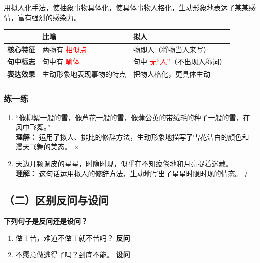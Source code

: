 \begin{definition}[拟人] \label{def:int} 
用拟人化手法，使抽象事物具体化，使具体事物人格化，生动形象地表达了某某感情，富有强烈的感染力。
\end{definition}

\begin{center}
    \renewcommand{\arraystretch}{1.8}
    \begin{tabular}{|>{\centering\arraybackslash}p{3cm}|>{\centering\arraybackslash}p{5.5cm}|>{\centering\arraybackslash}p{5.5cm}|}
        \hline
        & \textbf{比喻} & \textbf{拟人} \\
        \hline
        \textbf{核心特征} & 两物有 \textcolor{red}{相似点} & 物即人（将物当人来写） \\
        \hline
        \textbf{句中标志} & 句中有 \textcolor{red}{喻体} & 句中 \textcolor{red}{无“人”}（不出现人称词） \\
        \hline
        \textbf{表达效果} & 生动形象地表现事物的特点 & 把物人格化，更具体生动 \\
        \hline
    \end{tabular}
\end{center}

\subsubsection*{练一练}

\begin{enumerate}
    \item “像柳絮一般的雪，像芦花一般的雪，像蒲公英的带绒毛的种子一般的雪，在风中飞舞。” \\
    \textbf{理解：} 运用了拟人、排比的修辞方法，生动形象地描写了雪花洁白的颜色和漫天飞舞的美态。 \hfill ×

    \item 天边几颗调皮的星星，时隐时现，似乎在不知疲倦地和月亮捉着迷藏。 \\
    \textbf{理解：} 这句话运用拟人的修辞方法，生动地写出了星星时隐时现的情态。 \hfill √
\end{enumerate}

\subsection*{（二）区别反问与设问}

\textbf{下列句子是反问还是设问？}
\begin{enumerate}
    \item 做工苦，难道不做工就不苦吗？ \hfill \textbf{反问}
    \item 不愿意做逃得了吗？到底不能。 \hfill \textbf{设问}
\end{enumerate}

